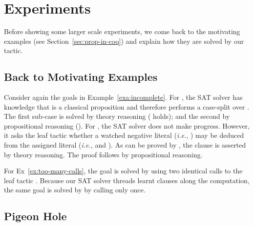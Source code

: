 \documentclass[utf8,a4paper,UKenglish,cleveref, autoref, thm-restate]{lipics-v2019}
\begin{document}
\section{Experiments}
\label{sec:experiments}

Before showing some larger scale experiments, we come back to the
motivating examples (see Section~\ref{sec:prop-in-coq}) and explain how
they are solved by our tactic.

\subsection{Back to Motivating Examples}

Consider again the goals in Example~\ref{exa:incomplete}.  For
, the SAT solver has knowledge that  is a classical
proposition and therefore performs a case-split over .
The first sub-case is solved by theory reasoning (
holds); and the second by propositional reasoning ().
%
For , the SAT solver does not make progress. However, it
asks the leaf tactic  whether a watched negative
literal (\emph{i.e.}, ) may be deduced from the assigned
literal (\emph{i.e.},  and ).
%
As  can be proved by ,
the clause is asserted by theory reasoning. The proof follows by
propositional reasoning.

For Ex~\ref{ex:too-many-calls}, the goal is solved by  using two identical calls to the leaf tactic .
%
Because our SAT solver threads learnt clauses along the computation,
the same goal is solved by  by calling
 only once.

\subsection{Pigeon Hole}
\end{document}
